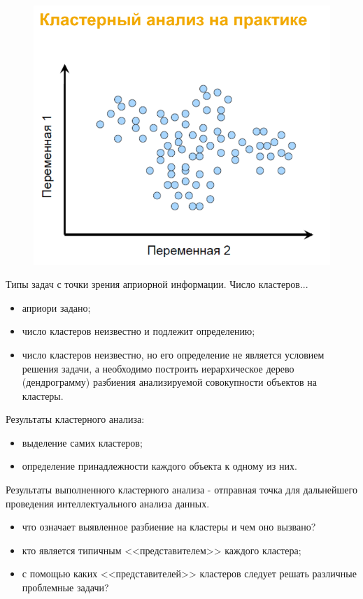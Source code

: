 \documentclass{beamer}
\begin{document}
\begin{frame}
\begin{minipage}{0.5\textwidth}
\begin{flushright}
\begin{figure}[h]
				\includegraphics[scale=0.2]{images/lec07-pic05.png}
			\end{figure}
		\end{flushright}
	\end{minipage}
\end{frame}

\begin{frame}
	Типы задач с точки зрения априорной информации. Число кластеров...
	\begin{itemize}
	    \item априори задано;
    	\item число кластеров неизвестно и подлежит определению;
    	\item число кластеров неизвестно, но его определение не является условием решения задачи, а необходимо построить иерархическое дерево (дендрограмму) разбиения анализируемой совокупности объектов на кластеры. 	
	\end{itemize}
	Результаты кластерного анализа:
	\begin{itemize}
		\item выделение самих кластеров;
		\item определение принадлежности каждого объекта к одному из них.
	\end{itemize}	 
	Результаты выполненного кластерного анализа - отправная точка для дальнейшего проведения интеллектуального анализа данных. 
	\begin{itemize}
		\item что означает выявленное разбиение на кластеры и чем оно вызвано?
		\item кто является типичным <<представителем>> каждого кластера;
		\item с помощью каких <<представителей>> кластеров следует решать различные проблемные задачи?
	\end{itemize}
\end{frame}
\end{document}
